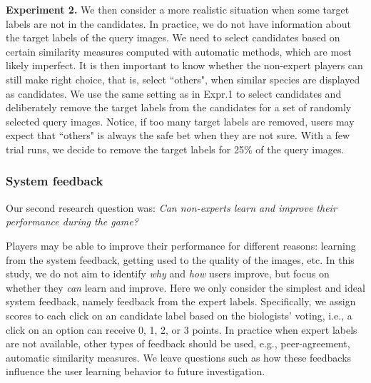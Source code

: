 \noindent
\textbf{Experiment 2.}
We then consider a more realistic situation when some target labels are not in the candidates. 
%
%
In practice, we do not have information about the target labels of the query images.
We need to select candidates based on certain similarity measures computed with automatic
methods, which are most likely imperfect. 
It is then important to know whether the non-expert players can still make right 
choice, that is, select ``others", when similar species are displayed as candidates. 
%
We use the same setting as in Expr.1 to select candidates and deliberately remove
the target labels from the candidates for a set of randomly selected query images. 
Notice, if too many target labels are removed, users may
expect that ``others" is always the safe bet when they are not sure.   
With a few trial runs, we decide to remove the target labels for 25\% of the query images. 
%

\subsubsection{System feedback}
\noindent
Our second research question was: \emph{Can non-experts learn and improve their performance during the game?}

Players may be able to improve their performance for different reasons:
learning from the system feedback, getting used to the quality of the images, etc.
In this study, we do not aim to identify \emph{why} and \emph{how} users improve, but focus on whether
they \emph{can} learn and improve. 
%
Here we only consider the simplest and ideal system feedback, namely feedback from the expert labels.
Specifically, we assign scores to each click on an candidate label based on the biologists' voting, 
i.e., a click on an option can receive 0, 1, 2, or 3 points.
%
In practice when expert labels are not available, other types of feedback should be used, e.g., 
peer-agreement, automatic similarity measures. 
We leave questions such as how these feedbacks influence the user learning behavior to future investigation.


